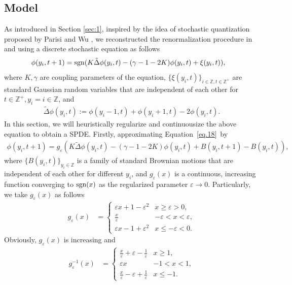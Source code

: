 \documentclass[11pt]{article}
\numberwithin{equation}{section}%
\numberwithin{figure}{section}%
\theoremstyle{remark}
\begin{document}
\subsection{Model}\label{sec:2.1}
	As introduced in Section \ref{sec:1}, inspired by the idea of stochastic quantization proposed by Parisi and Wu \cite{PARISI1981document}, we reconstructed the renormalization  procedure in  \cite{Cui2022document} and \cite{Cui2024document} using a discrete stochastic equation as follows
	\begin{align}\label{eq.18}
		\phi(y_{i},t+1)&={\rm sgn}(K\tilde{\Delta }\phi(y_{i},t)-(\gamma-1-2K)\phi(y_{i},t)+\xi(y_{i},t)),
	\end{align}
	where $K,\gamma$ are coupling parameters of the equation, $\{\xi(y_{i},t)\}_{i\in\mathbb{Z},t\in\mathbb{Z}^{+}}$ are standard Gaussian random variables that are independent of each other for $t\in\mathbb{Z}^{+},y_{i}=i\in\mathbb{Z}$, and
	\begin{align*}
		\tilde{\Delta }\phi(y_{i},t):=\phi(y_{i}-1,t)+\phi(y_{i}+1,t)-2\phi(y_{i},t).
	\end{align*}
	In this section, we will heuristically regularize and continuousize the above equation to obtain a SPDE. Firstly, approximating Equation~\eqref{eq.18}~by
	\begin{align*}
		\phi(y_{i},t+1)=g_{\varepsilon}(K\tilde{\Delta }\phi(y_{i},t)-(\gamma-1-2K)\phi(y_{i},t)+B(y_{i},t+1)-B(y_{i},t)),
	\end{align*}
	where $\{B(y_{i},t)\}_{y_{i}\in\mathbb{Z}}$ is a family of standard Brownian motions that are independent of each other for different $y_{i}$, and $g_{\varepsilon}(x)$ is a continuous, increasing function converging to ${\rm sgn}(x)$ as the regularized parameter 
	$\varepsilon\rightarrow 0$. Particularly, 
	we take $g_{\varepsilon}(x)$ as follows
	\begin{align*}
		g_{\varepsilon}(x)&=\left\{
		\begin{array}{ll}
			\varepsilon x+1-\varepsilon^{2} &x\geq \varepsilon>0,\\
			\frac{x}{\varepsilon} &-\varepsilon <x< \varepsilon,\\
			\varepsilon x-1+\varepsilon^{2} &x\leq -\varepsilon<0.
		\end{array}\right.
	\end{align*}
	Obviously, $g_{\varepsilon}(x)$ is increasing and
	\begin{align*}
		g^{-1}_{\varepsilon}(x)&=\left\{
		\begin{array}{ll}
			\frac{x}{\varepsilon} +\varepsilon-\frac{1}{\varepsilon}  &x\geq 1,\\
			\varepsilon x &-1 <x< 1,\\
			\frac{x}{\varepsilon} -\varepsilon+\frac{1}{\varepsilon}  &x\leq -1.
		\end{array}\right.
	\end{align*}
\end{document}
